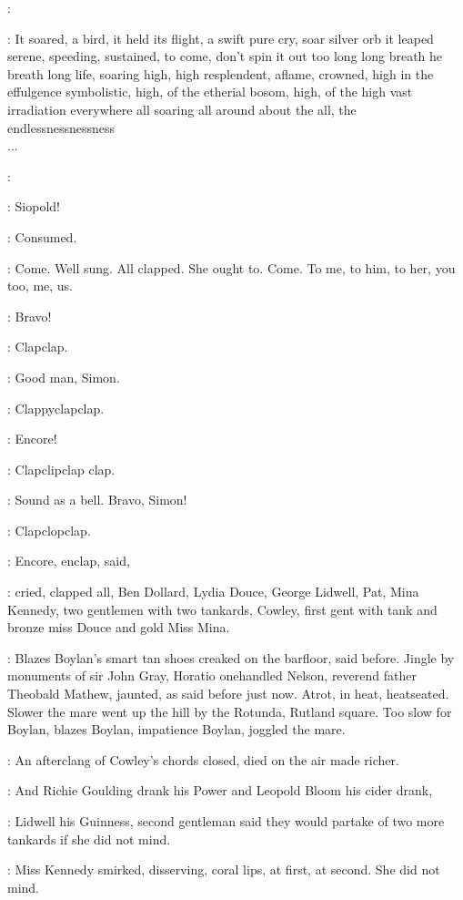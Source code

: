 \simon:

:
It soared,
a bird,
it held its flight,
a swift pure cry,
soar silver orb
it leaped serene,
speeding,
sustained,
to come,
don't spin it out too long
long breath he breath long life,
soaring high,
high resplendent,
aflame,
crowned,
high in the effulgence symbolistic,
high,
of the etherial bosom,
high,
of the high vast irradiation everywhere all soaring all around about
the all,
the endlessnessnessness%
\\
...

\simon:

\BloomInt:
Siopold!

\BloomInt:
Consumed.

\BloomInt:
Come.
Well sung.
All clapped.
She ought to.
Come.
To me,
to him,
to
her,
you too,
me,
us.

\lenehan:
Bravo!

:
Clapclap.

\dollard:
Good man,
Simon.

:
Clappyclapclap.

\cowley:
Encore!

:
Clapclipclap clap.

\lenehan:
Sound as a bell.
Bravo,
Simon!

:
Clapclopclap.

:
Encore,
enclap,
said,

:
cried,
clapped all,
Ben Dollard,
Lydia Douce,
George
Lidwell,
Pat,
Mina Kennedy,
two gentlemen with two tankards,
Cowley,
first gent with tank and bronze miss Douce
and gold Miss Mina.

:
Blazes Boylan's smart tan shoes creaked on the barfloor,
said before.
Jingle by monuments of sir John Gray,
Horatio onehandled Nelson,
reverend father Theobald Mathew,
jaunted,
as said before just now.
Atrot,
in heat,
heatseated.
Slower the mare
went up the hill by the Rotunda,
Rutland square.
Too slow for Boylan,
blazes Boylan,
impatience Boylan,
joggled the mare.

:
An afterclang of Cowley's chords closed,
died on the air
made richer.

:
And Richie Goulding drank his Power and Leopold Bloom his cider
drank,

:
Lidwell his Guinness,
second gentleman said they would partake of
two more tankards if she did not mind.

:
Miss Kennedy smirked,
disserving,
coral lips,
at first,
at second.
She did not mind.

